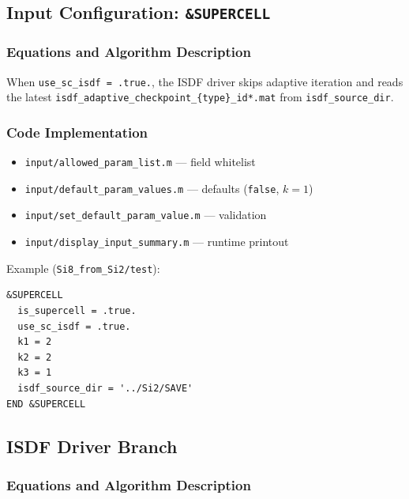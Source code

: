 \documentclass[11pt,a4paper]{article}
\begin{document}
\subsection{Input Configuration: \texttt{\&SUPERCELL}}

\subsubsection{Equations and Algorithm Description}

When \texttt{use\_sc\_isdf = .true.}, the ISDF driver skips adaptive iteration
and reads the latest \texttt{isdf\_adaptive\_checkpoint\_\{type\}\_id*.mat}
from \texttt{isdf\_source\_dir}.

\subsubsection{Code Implementation}

\begin{itemize}
  \item \texttt{input/allowed\_param\_list.m} --- field whitelist
  \item \texttt{input/default\_param\_values.m} --- defaults (\texttt{false}, $k=1$)
  \item \texttt{input/set\_default\_param\_value.m} --- validation
  \item \texttt{input/display\_input\_summary.m} --- runtime printout
\end{itemize}

Example (\texttt{Si8\_from\_Si2/test}):
\begin{lstlisting}
&SUPERCELL
  is_supercell = .true.
  use_sc_isdf = .true.
  k1 = 2
  k2 = 2
  k3 = 1
  isdf_source_dir = '../Si2/SAVE'
END &SUPERCELL
\end{lstlisting}

\subsection{ISDF Driver Branch}

\subsubsection{Equations and Algorithm Description}
\end{document}

